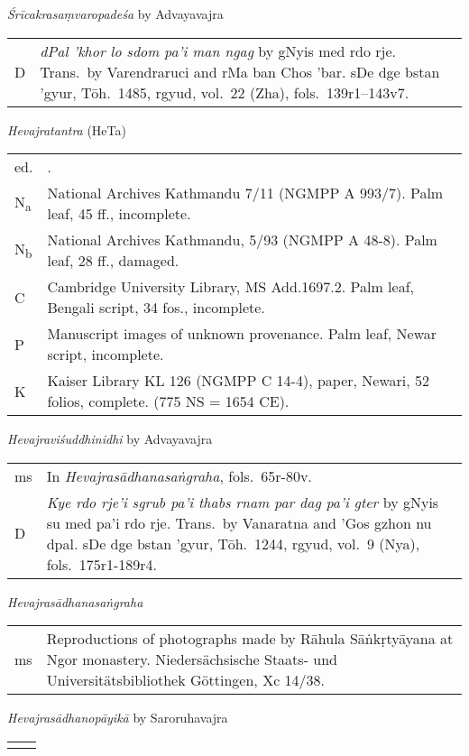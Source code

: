 \documentclass[12pt,twoside]{article}
\newcommand{\mybibexclude}[1]{\addtocategory{fullcited}{#1}}
\begin{document}
\noindent\emph{Śrīcakrasaṃvaropadeśa} by Advayavajra
\noindent\begin{longtable}{ p{} p{} }
	D & \emph{dPal 'khor lo sdom pa'i man ngag} by gNyis med rdo rje. Trans.\ by Varendraruci and rMa ban Chos 'bar. sDe dge bstan 'gyur, Tōh.\ 1485, rgyud, vol.\ 22 (Zha), fols.\ 139r1–143v7. 
\end{longtable}

\noindent\emph{Hevajratantra} (HeTa) 
\noindent\begin{longtable}{ p{} p{} }
	ed. & \fullcite*{snellgrove1959}.\mybibexclude{snellgrove1959} \\
	N\textsubscript{a} & National Archives Kathmandu 7/11 (NGMPP A 993/7). Palm leaf, 45 ff., incomplete. \\
	N\textsubscript{b} & National Archives Kathmandu, 5/93 (NGMPP A 48-8). Palm leaf, 28 ff., damaged. \\
	C & Cambridge University Library, MS Add.1697.2. Palm leaf, Bengali script, 34 fos., incomplete. \\
	P & Manuscript images of unknown provenance. Palm leaf, Newar script, incomplete. \\
	K & Kaiser Library KL 126 (NGMPP C 14-4), paper, Newari, 52 folios, complete. (775 NS = 1654 CE). 
\end{longtable}

\noindent\emph{Hevajraviśuddhinidhi} by Advayavajra
\noindent\begin{longtable}{ p{} p{} }
	ms & In \emph{Hevajrasādhanasaṅgraha}, fols.\ 65r-80v. \\
	D & \emph{Kye rdo rje'i sgrub pa'i thabs rnam par dag pa'i gter} by gNyis su med pa'i rdo rje. Trans.\ by Vanaratna and 'Gos gzhon nu dpal. sDe dge bstan 'gyur, Tōh.\ 1244, rgyud, vol.\ 9 (Nya), fols.\ 175r1-189r4. 
\end{longtable}

\noindent\emph{Hevajrasādhanasaṅgraha}
\noindent\begin{longtable}{ p{} p{} }
	ms & Reproductions of photographs made by Rāhula Sāṅkṛtyāyana at Ngor monastery. Niedersächsische Staats- und Universitätsbibliothek Göttingen, Xc 14/38. 
\end{longtable}

\noindent\emph{Hevajrasādhanopāyikā} by Saroruhavajra
\noindent\begin{longtable}{ p{} p{} }
	& \textcite*[vo.\ 1 pp.\ 99–121]{gerloff2020} 
\end{longtable}
\end{document}
